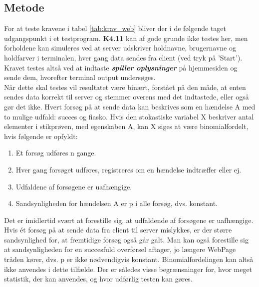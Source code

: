 \documentclass[Modultest/Modultest_main.tex]{subfiles}
\begin{document}
\subsection{Metode}
For at teste kravene i tabel \ref{tab:krav_web} bliver der i de følgende taget udgangspunkt i et testprogram. \textbf{K4.11} kan af gode grunde ikke testes her, men forholdene kan simuleres ved at server udskriver holdnavne, brugernavne og holdfarver i terminalen, hver gang data sendes fra client (ved tryk på 'Start'). Kravet testes altså ved at indtaste \textit{\textbf{spiller oplysninger}} på hjemmesiden og sende dem, hvorefter terminal output undersøges.
\\Når dette skal testes vil resultatet være binært, forstået på den måde, at enten sendes data korrekt til server og stemmer overens med det indtastede, eller også gør det ikke. Hvert forsøg på at sende data kan beskrives som en hændelse A med to mulige udfald: succes og fiasko.
Hvis den stokastiske variabel X beskriver antal elementer i stikprøven, med egenskaben A, kan X siges at være binomialfordelt, hvis følgende er opfyldt:\cite{binomial_wiki}
\begin{enumerate}
    \item Et forsøg udføres n gange.
    \item Hver gang forsøget udføres, registreres om en hændelse indtræffer eller ej.
    \item Udfaldene af forsøgene er uafhængige.
    \item Sandsynligheden for hændelsen A er p i alle forsøg, dvs. konstant.
\end{enumerate}
Det er imidlertid svært at forestille sig, at udfaldende af forsøgene er uafhængige. Hvis ét forsøg på at sende data fra client til server mislykkes, er der større sandsynlighed for, at
fremtidige forsøg også går galt. Man kan også forestille sig at sandsynligheden for en succesfuld overførsel aftager, jo længere WebPage tråden kører, dvs. p er ikke nødvendigvis konstant. Binomialfordelingen kan altså ikke anvendes i dette tilfælde. Der er således visse begrænsninger for, hvor meget statistik, der kan anvendes, og hvor udførlig testen kan gøres. \\
\newpage
\end{document}

